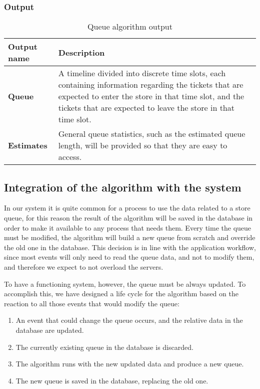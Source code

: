 \subsubsection{Output}
\label{subsubsect:Output}

\begin{table}[h!]
    \centering
    \begin{tabular}{@{}P{0.13\textwidth}P{0.85\textwidth}@{}}
        \toprule
        \textbf{Output name}& \textbf{Description}\\
        \midrule
        \textbf{Queue}                & A timeline divided into discrete time slots, each containing information regarding the tickets that are expected to enter the store in that time slot, and the tickets that are expected to leave the store in that time slot.\\
        \textbf{Estimates}            & General queue statistics, such as the estimated queue length, will be provided so that they are easy to access.\\
    \end{tabular}
\caption{Queue algorithm output}
\label{table:output}
\end{table}

\subsection{Integration of the algorithm with the system}
\label{subsubsect:integrationofthealgorithmintothesystem}

In our system it is quite common for a process to use the data related to a store queue, for this reason the result of the algorithm will be saved in the database in order to make it available to any process that needs them. Every time the queue must be modified, the algorithm will build a new queue from scratch and override the old one in the database. This decision is in line with the application workflow, since most events will only need to read the queue data, and not to modify them, and therefore we expect to not overload the servers.

To have a functioning system, however, the queue must be always updated. To accomplish this, we have designed a life cycle for the algorithm based on the reaction to all those events that would modify the queue:

\begin{enumerate}[topsep=0pt]
    \item An event that could change the queue occurs, and the relative data in the database are updated.
    \item The currently existing queue in the database is discarded.
    \item The algorithm runs with the new updated data and produce a new queue.
    \item The new queue is saved in the database, replacing the old one.
\end{enumerate}

